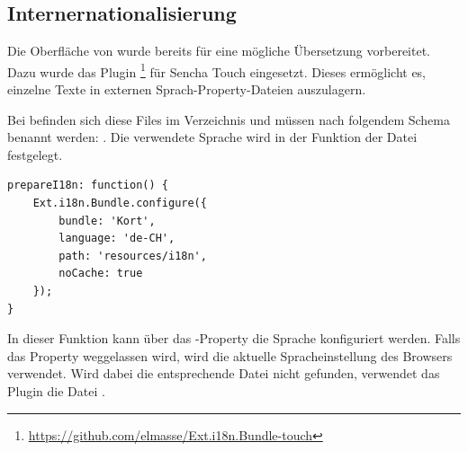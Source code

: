 \subsection{Internernationalisierung}
\label{i18n}
Die Oberfläche von \kort{} wurde bereits für eine mögliche Übersetzung vorbereitet.
Dazu wurde das Plugin \footnote{\url{https://github.com/elmasse/Ext.i18n.Bundle-touch}} für Sencha Touch eingesetzt.
Dieses ermöglicht es, einzelne Texte in externen Sprach-Property-Dateien auszulagern.

Bei \kort{} befinden sich diese Files im Verzeichnis  und müssen nach folgendem Schema benannt werden: .
Die verwendete Sprache wird in der Funktion  der Datei  festgelegt.

\lstset{language=JavaScript}
\begin{lstlisting}[caption=kort - Sprache definieren, label=kort-choose-language]
prepareI18n: function() {
	Ext.i18n.Bundle.configure({
		bundle: 'Kort',
		language: 'de-CH',
		path: 'resources/i18n',
		noCache: true
	});
}
\end{lstlisting}

In dieser Funktion kann über das -Property die Sprache konfiguriert werden.
Falls das Property weggelassen wird, wird die aktuelle Spracheinstellung des Browsers verwendet.
Wird dabei die entsprechende Datei nicht gefunden, verwendet das Plugin die Datei .